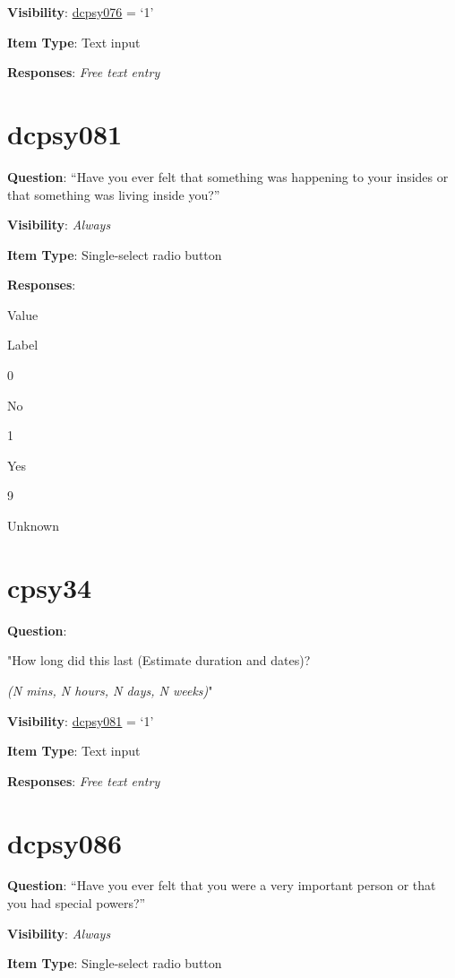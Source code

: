\documentclass[]{book}
\begin{document}
\textbf{Visibility}: \protect\hyperlink{dcpsy076}{dcpsy076} = `1'

\textbf{Item Type}: Text input

\textbf{Responses}: \emph{Free text entry}

\hypertarget{dcpsy081}{%
\section{dcpsy081}\label{dcpsy081}}

\textbf{Question}: ``Have you ever felt that something was happening to your insides or that something was living inside you?''

\textbf{Visibility}: \emph{Always}

\textbf{Item Type}: Single-select radio button

\textbf{Responses}:

Value

Label

0

No

1

Yes

9

Unknown

\hypertarget{cpsy34}{%
\section{cpsy34}\label{cpsy34}}

\textbf{Question}:

"How long did this last (Estimate duration and dates)?

\emph{(N mins, N hours, N days, N weeks)}"

\textbf{Visibility}: \protect\hyperlink{dcpsy081}{dcpsy081} = `1'

\textbf{Item Type}: Text input

\textbf{Responses}: \emph{Free text entry}

\hypertarget{dcpsy086}{%
\section{dcpsy086}\label{dcpsy086}}

\textbf{Question}: ``Have you ever felt that you were a very important person or that you had special powers?''

\textbf{Visibility}: \emph{Always}

\textbf{Item Type}: Single-select radio button
\end{document}
